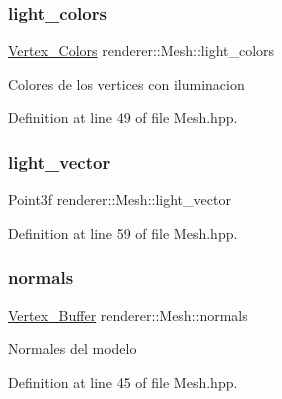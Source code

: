 \subsubsection{\texorpdfstring{light\_colors}{light\_colors}}
{\footnotesize\ttfamily \mbox{\hyperlink{classrenderer_1_1_mesh_ab384ccca7ccccac4b935fe797ce0a7ea}{Vertex\+\_\+\+Colors}} renderer\+::\+Mesh\+::light\+\_\+colors\hspace{0.3cm}{\ttfamily [private]}}

Colores de los vertices con iluminacion 

Definition at line 49 of file Mesh.\+hpp.

\mbox{\label{classrenderer_1_1_mesh_a6bf2d3288700befda4d24c6ee44e7a3f}} 
\subsubsection{\texorpdfstring{light\_vector}{light\_vector}}
{\footnotesize\ttfamily Point3f renderer\+::\+Mesh\+::light\+\_\+vector\hspace{0.3cm}{\ttfamily [private]}}



Definition at line 59 of file Mesh.\+hpp.

\mbox{\label{classrenderer_1_1_mesh_a88ff332e89b6278946fc7f61f0014d0d}} 
\subsubsection{\texorpdfstring{normals}{normals}}
{\footnotesize\ttfamily \mbox{\hyperlink{classrenderer_1_1_mesh_a8c848a95f65fb25f6dc94dcb8879cf8b}{Vertex\+\_\+\+Buffer}} renderer\+::\+Mesh\+::normals\hspace{0.3cm}{\ttfamily [private]}}

Normales del modelo 

Definition at line 45 of file Mesh.\+hpp.

\mbox{\label{classrenderer_1_1_mesh_aa32dd73ecaaaf1f5594f12c6208df116}} 
